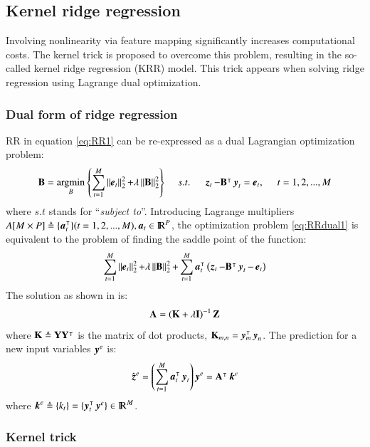 \subsection{Kernel ridge regression}
Involving nonlinearity via feature mapping significantly increases computational costs. The kernel trick is proposed \citep{saunders1998ridge} to overcome this problem, resulting in the so-called kernel ridge regression (KRR) model. This trick appears when solving ridge regression using Lagrange dual optimization.

\subsubsection*{Dual form of ridge regression}
RR in equation \ref{eq:RR1} can be re-expressed as a dual Lagrangian optimization problem:
\begin{equation}
\mathbf{B}=\operatorname*{\arg\!\min}_B{ \left\lbrace \sum\limits_{t=1}^{M}\operatorname{\Arrowvert \mathit{\operatorname{\boldsymbol{e}}_t} \Arrowvert^2_2 } + \lambda \operatorname{\Arrowvert \mathit{\mathbf{B}} \Arrowvert^2_2 } \right\rbrace } \:\:\:\:\:\: s.t. \:\:\:\:\:\: \operatorname{\boldsymbol{z}}_t - \mathbf{B}^{\intercal}\operatorname{\boldsymbol{y}}_t = \operatorname{\boldsymbol{e}}_t, \:\:\:\:\:\: t = 1, 2, ..., M
\label{eq:RRdual1}
\end{equation}
where $ s.t $ stands for ``\textit{subject to}''. Introducing Lagrange multipliers $ A[M \times P] \triangleq \{\operatorname{\boldsymbol{a}}_t^{\intercal} \} (t = 1, 2, ..., M), \operatorname{\boldsymbol{a}}_t \in {\rm I\!R}^{P}$, the optimization problem \ref{eq:RRdual1} is equivalent to the problem of finding the saddle point of the function:
\begin{equation}
\sum\limits_{t=1}^{M}\operatorname{\Arrowvert \mathit{\operatorname{\boldsymbol{e}}_t} \Arrowvert^2_2 } + \lambda \operatorname{\Arrowvert \mathit{\mathbf{B}} \Arrowvert^2_2 } + \sum\limits_{t=1}^{M} \operatorname{\boldsymbol{a}}_t^{\intercal}\left( \operatorname{\boldsymbol{z}}_t - \mathbf{B}^{\intercal}\operatorname{\boldsymbol{y}}_t - \operatorname{\boldsymbol{e}}_t\right)
\end{equation}
The solution as shown in \citet{saunders1998ridge} is:
\begin{equation}
\mathbf{A}  = \left(\mathbf{K} + \lambda \mathbf{I}\right)^{-1}\mathbf{Z}
\end{equation}
where $ \mathbf{K} \triangleq \mathbf{Y}\mathbf{Y}^{\intercal} $ is the matrix of dot products, $ \mathbf{K}_{m,n} = \operatorname{\boldsymbol{y}} _m^{\intercal} \operatorname{\boldsymbol{y}} _n $. The prediction for a new input variables $ \operatorname{\boldsymbol{y}}^{e} $ is:
\begin{equation}
\operatorname{\hat{\operatorname{\boldsymbol{z}} }}^{e} = \left(\sum\limits_{t=1}^{M}\operatorname{\boldsymbol{a}}_t^{\intercal}\operatorname{\boldsymbol{y}}_t\right)\operatorname{\boldsymbol{y}}^{e} = \mathbf{A}^{\intercal} \operatorname{\boldsymbol{k}}^{{e}}
\end{equation}
where $ \operatorname{\boldsymbol{k}}^{{e}} \triangleq \{k_t\} = \{ \operatorname{\boldsymbol{y}}_t^{\intercal} \operatorname{\boldsymbol{y}}^{e} \} \in {\rm I\!R}^{M}$.
 
\subsubsection*{Kernel trick}

